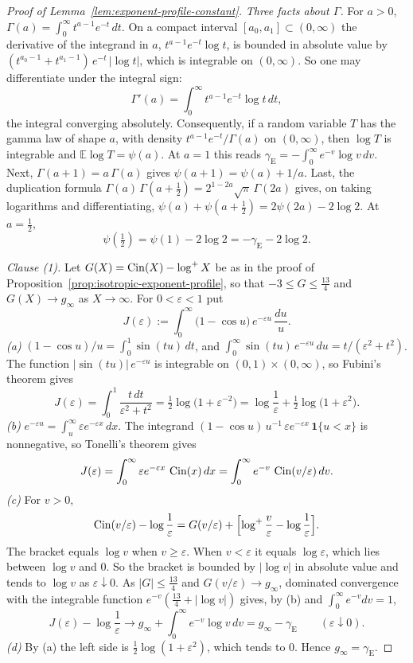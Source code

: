\begin{proof}[Proof of Lemma~\ref{lem:exponent-profile-constant}]
\emph{Three facts about $\Gamma$.} For $a > 0$, $\Gamma(a) = \int_0^\infty t^{a-1}e^{-t}\,dt$. On
a compact interval $[a_0,a_1] \subset (0,\infty)$ the derivative of the integrand in $a$,
$t^{a-1}e^{-t}\log t$, is bounded in absolute value by
$(t^{a_0-1} + t^{a_1-1})\,e^{-t}\,|\log t|$, which is integrable on $(0,\infty)$. So one may
differentiate under the integral sign:
\[
  \Gamma'(a) = \int_0^\infty t^{a-1}e^{-t}\log t\,dt ,
\]
the integral converging absolutely. Consequently, if a random variable $T$ has the gamma law of
shape $a$, with density $t^{a-1}e^{-t}/\Gamma(a)$ on $(0,\infty)$, then $\log T$ is integrable and
$\mathbb{E}\log T = \psi(a)$. At $a = 1$ this reads
$\gamma_{\mathrm E} = -\int_0^\infty e^{-v}\log v\,dv$. Next, $\Gamma(a+1) = a\,\Gamma(a)$ gives
$\psi(a+1) = \psi(a) + 1/a$. Last, the duplication formula
$\Gamma(a)\,\Gamma(a+\tfrac12) = 2^{1-2a}\sqrt\pi\,\Gamma(2a)$ gives, on taking logarithms and
differentiating, $\psi(a) + \psi(a+\tfrac12) = 2\psi(2a) - 2\log 2$. At $a = \tfrac12$,
\[
  \psi(\tfrac12) = \psi(1) - 2\log 2 = -\gamma_{\mathrm E} - 2\log 2 .
\]

\emph{Clause (1).} Let $G(X) = \operatorname{Cin}(X) - \log^+ X$ be as in the proof of
Proposition~\ref{prop:isotropic-exponent-profile}, so that $-3 \le G \le \tfrac{13}{4}$ and
$G(X) \to g_\infty$ as $X \to \infty$. For $0 < \varepsilon < 1$ put
\[
  J(\varepsilon) := \int_0^\infty \bigl(1 - \cos u\bigr)\,e^{-\varepsilon u}\,\frac{du}{u} .
\]
\emph{(a)} $(1 - \cos u)/u = \int_0^1 \sin(tu)\,dt$, and
$\int_0^\infty \sin(tu)\,e^{-\varepsilon u}\,du = t/(\varepsilon^2 + t^2)$. The function
$|\sin(tu)|\,e^{-\varepsilon u}$ is integrable on $(0,1) \times (0,\infty)$, so Fubini's theorem
gives
\[
  J(\varepsilon) = \int_0^1 \frac{t\,dt}{\varepsilon^2 + t^2}
   = \tfrac12\log\bigl(1 + \varepsilon^{-2}\bigr)
   = \log\frac1\varepsilon + \tfrac12\log\bigl(1 + \varepsilon^{2}\bigr) .
\]
\emph{(b)} $e^{-\varepsilon u} = \int_u^\infty \varepsilon e^{-\varepsilon x}\,dx$. The integrand
$(1 - \cos u)\,u^{-1}\,\varepsilon e^{-\varepsilon x}\,\mathbf 1\{u < x\}$ is nonnegative, so
Tonelli's theorem gives
\[
  J(\varepsilon) = \int_0^\infty \varepsilon e^{-\varepsilon x}\,\operatorname{Cin}(x)\,dx
   = \int_0^\infty e^{-v}\,\operatorname{Cin}(v/\varepsilon)\,dv .
\]
\emph{(c)} For $v > 0$,
\[
  \operatorname{Cin}(v/\varepsilon) - \log\frac1\varepsilon
   = G(v/\varepsilon) + \Bigl[\log^+\frac v\varepsilon - \log\frac1\varepsilon\Bigr] .
\]
The bracket equals $\log v$ when $v \ge \varepsilon$. When $v < \varepsilon$ it equals
$\log\varepsilon$, which lies between $\log v$ and $0$. So the bracket is bounded by $|\log v|$ in
absolute value and tends to $\log v$ as $\varepsilon \downarrow 0$. As $|G| \le \tfrac{13}{4}$ and
$G(v/\varepsilon) \to g_\infty$, dominated convergence with the integrable function
$e^{-v}(\tfrac{13}{4} + |\log v|)$ gives, by (b) and $\int_0^\infty e^{-v}dv = 1$,
\[
  J(\varepsilon) - \log\frac1\varepsilon \to g_\infty + \int_0^\infty e^{-v}\log v\,dv
   = g_\infty - \gamma_{\mathrm E} \qquad (\varepsilon \downarrow 0) .
\]
\emph{(d)} By (a) the left side is $\tfrac12\log(1 + \varepsilon^2)$, which tends to $0$. Hence
$g_\infty = \gamma_{\mathrm E}$.


\end{proof}
